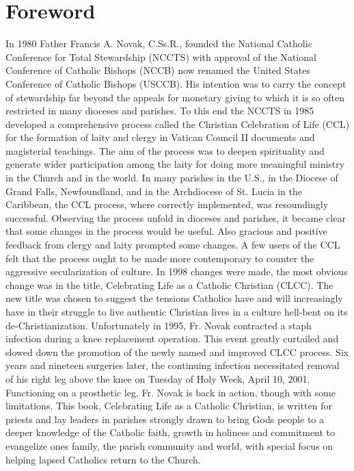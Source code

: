 \documentclass[oneside]{book}
\begin{document}
\chapter{Foreword}

In 1980 Father Francis A. Novak, C.Ss.R., founded the National Catholic
Conference for Total Stewardship (NCCTS) with approval of the National
Conference of Catholic Bishops (NCCB) now renamed the United States Conference
of Catholic Bishops (USCCB).  His intention was to carry the concept of
stewardship far beyond the appeals for monetary giving to which it is so often
restricted in many dioceses and parishes.  To this end the NCCTS in 1985
developed a comprehensive process called the Christian Celebration of Life (CCL)
for the formation of laity and clergy in Vatican Council II documents and
magisterial teachings. The aim of the process was to deepen spirituality and
generate wider participation among the laity for doing more meaningful ministry
in the Church and in the world.  In many parishes in the U.S., in the Diocese of
Grand Falls, Newfoundland, and in the Archdiocese of St. Lucia in the Caribbean,
the CCL process, where correctly implemented, was resoundingly successful.
Observing the process unfold in dioceses and parishes, it became clear that some
changes in the process would be useful. Also gracious and positive feedback from
clergy and laity prompted some changes. A few users of the CCL felt that the
process ought to be made more contemporary to counter the aggressive
secularization of culture. In 1998 changes were made, the most obvious change
was in the title, Celebrating Life as a Catholic Christian (CLCC). The new title
was chosen to suggest the tensions Catholics have and will increasingly have in
their struggle to live authentic Christian lives in a culture hell-bent on its
de-Christianization.  Unfortunately in 1995, Fr. Novak contracted a staph
infection during a knee replacement operation. This event greatly curtailed and
slowed down the promotion of the newly named and improved CLCC process. Six
years and nineteen surgeries later, the continuing infection necessitated
removal of his right leg above the knee on Tuesday of Holy Week, April 10, 2001.
Functioning on a prosthetic leg, Fr. Novak is back in action, though with some
limitations. This book, Celebrating Life as a Catholic Christian, is written for
priests and lay leaders in parishes strongly drawn to bring Gods people to a
deeper knowledge of the Catholic faith, growth in holiness and commitment to
evangelize ones family, the parish community and world, with special focus on
helping lapsed Catholics return to the Church.
\end{document}
